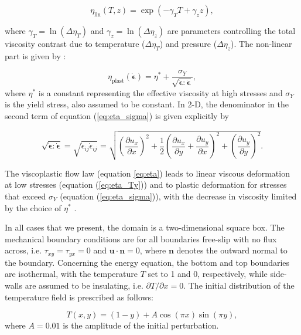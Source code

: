 \begin{equation}
\eta_\text{lin} (T,z) = \exp(-\gamma_T T + \gamma_{z} z), \label{eq:eta_Ty}
\end{equation}

where $\gamma_T = \ln ( \Delta\eta_T)$ and $\gamma_{z}=\ln(\Delta\eta_{z})$ are parameters controlling the total viscosity 
contrast due to temperature ($\Delta\eta_T$) and pressure ($\Delta\eta_{z}$). The non-linear part is given by \cite{trha98,trha98b}: 

\begin{equation}
\eta_\text{plast} (\dot{\boldsymbol{\epsilon}}) 
= \eta^{*} + \frac{\sigma_Y}{\sqrt{\dot{\boldsymbol{\epsilon}}:\dot{\boldsymbol{\epsilon}}}}, \label{eq:eta_sigma}
\end{equation}
where $\eta^*$ is a constant representing the effective viscosity at high stresses \cite{stlh14} and $\sigma_Y$ is the yield stress, also assumed to be constant. In 2-D, the denominator in the second term of 
equation (\ref{eq:eta_sigma}) is given explicitly by

\begin{equation}
\sqrt{\dot{\boldsymbol{\epsilon}}:\dot{\boldsymbol{\epsilon}}} 
= \sqrt{\dot{\epsilon}_{ij} \dot{\epsilon}_{ij} } 
= \sqrt{\left( \frac{\partial u_x}{\partial x} \right)^2 + \frac{1}{2} \left( \frac{\partial u_x}{\partial y} 
+ \frac{\partial u_y}{\partial x} \right)^2 + \left( \frac{\partial u_y}{\partial y} \right)^2  }.
\end{equation}

The viscoplastic flow law (equation \ref{eq:eta}) leads to linear viscous 
deformation at low stresses (equation (\ref{eq:eta_Ty})) 
and to plastic deformation for stresses that exceed $\sigma_Y$ (equation (\ref{eq:eta_sigma})), 
with the decrease in viscosity limited by the choice of $\eta^{*}$ \cite{stlh14}.

In all cases that we present, the domain is a two-dimensional square box. The mechanical 
boundary conditions are for all boundaries free-slip 
with no flux across, i.e. $\tau_{xy}=\tau_{yx}=0$ and $\boldsymbol{u}\cdot \boldsymbol{n}=0$, 
where $\boldsymbol{n}$ denotes the outward normal to 
the boundary. Concerning the energy equation, the bottom and top boundaries are isothermal, 
with the temperature $T$ set to 1 and 0, respectively, 
while side-walls are assumed to be insulating, i.e. $\partial T/\partial x = 0$. 
The initial distribution of the temperature field is prescribed as follows:

\begin{equation}
T(x,y) = (1-y) + A \cos(\pi x)\sin(\pi y), \label{eq:initemp}
\end{equation}
where $A=0.01$ is the amplitude of the initial perturbation.


